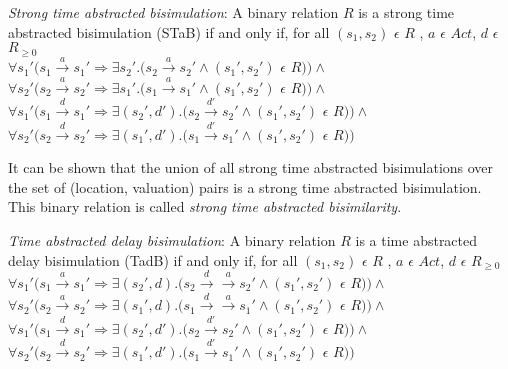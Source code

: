 \documentclass[a4paper]{llncs}
\begin{document}
\begin{definition} 
\label{def:stab} 
  \emph{Strong time abstracted bisimulation}: A binary relation
  $R$ is a strong time abstracted bisimulation (STaB) if and only if, for all
  $(s_1, s_2)$ $\epsilon$ $R$ , $a$ $\epsilon$ $Act $, $d$ $\epsilon$ $R_{\ge 0}$\\
  $\forall s_1' (s_1 \xrightarrow{a} s_1' \Rightarrow \exists s_2'
  . (s_2 \xrightarrow{a} s_2' \wedge (s_1', s_2')$ $\epsilon$ $R ) )
  \wedge $ \\
  $\forall s_2' (s_2 \xrightarrow{a} s_2' \Rightarrow \exists s_1'
  . (s_1 \xrightarrow{a} s_1' \wedge (s_1', s_2')$ $\epsilon$ $R ) ) \wedge $ \\
  $\forall s_1' (s_1 \xrightarrow{d} s_1' \Rightarrow \exists (s_2',
  d')
  . (s_2 \xrightarrow{d'} s_2' \wedge (s_1', s_2')$ $\epsilon$ $R ) )
  \wedge $ \\
  $\forall s_2' (s_2 \xrightarrow{d} s_2' \Rightarrow \exists (s_1', d')
  . (s_1 \xrightarrow{d'} s_1' \wedge (s_1', s_2')$ $\epsilon$ $R ) ) $ \\
\end{definition}

It can be shown that the union of all strong time abstracted
  bisimulations over the set of (location, valuation) pairs is a
  strong time abstracted bisimulation. This binary relation is called
  \textit{strong time abstracted bisimilarity}.

\begin{definition}
  \emph{Time abstracted delay bisimulation}: A binary relation
  $R$ is a time abstracted delay bisimulation (TadB) if and only if, for all
  $(s_1, s_2)$ $\epsilon$ $R$ , $a$ $\epsilon$ $Act $, $d$ $\epsilon$ $R_{\ge 0}$\\
  $\forall s_1' (s_1 \xrightarrow{a} s_1' \Rightarrow \exists (s_2', d)
  . (s_2 \xrightarrow{d} \xrightarrow{a} s_2' \wedge (s_1', s_2')$ $\epsilon$ $R ) )
  \wedge $ \\
  $\forall s_2' (s_2 \xrightarrow{a} s_2' \Rightarrow \exists (s_1', d)
  . (s_1 \xrightarrow{d} \xrightarrow{a} s_1' \wedge (s_1', s_2')$
  $\epsilon$ $R ) ) 
  \wedge $ \\
  $\forall s_1' (s_1 \xrightarrow{d} s_1' \Rightarrow \exists (s_2',
  d')
  . (s_2 \xrightarrow{d'} s_2' \wedge (s_1', s_2')$ $\epsilon$ $R ) )
  \wedge $ \\
  $\forall s_2' (s_2 \xrightarrow{d} s_2' \Rightarrow \exists (s_1', d')
  . (s_1 \xrightarrow{d'} s_1' \wedge (s_1', s_2')$ $\epsilon$ $R ) ) $ \\
\end{definition}
\end{document}
